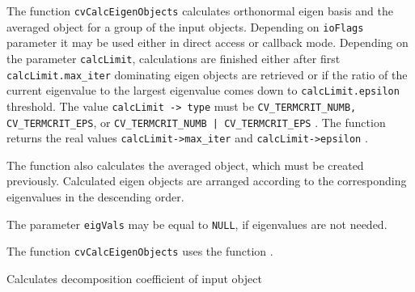 \begin{description}
\end{description}

The function \texttt{cvCalcEigenObjects} calculates orthonormal eigen basis and the averaged object for a group of the input objects. Depending on \texttt{ioFlags} parameter it may be used either in direct access or callback mode. Depending on the parameter \texttt{calcLimit}, calculations are finished either after first \texttt{calcLimit.max\_iter} dominating eigen objects are retrieved or if the ratio of the current eigenvalue to the largest eigenvalue comes down to \texttt{calcLimit.epsilon} threshold. The value \texttt{calcLimit -> type} must be \texttt{CV\_TERMCRIT\_NUMB, CV\_TERMCRIT\_EPS}, or \texttt{CV\_TERMCRIT\_NUMB | CV\_TERMCRIT\_EPS} . The function returns the real values \texttt{calcLimit->max\_iter} and \texttt{calcLimit->epsilon} .

The function also calculates the averaged object, which must be created previously. Calculated eigen objects are arranged according to the corresponding eigenvalues in the descending order.

The parameter \texttt{eigVals} may be equal to \texttt{NULL}, if eigenvalues are not needed.

The function \texttt{cvCalcEigenObjects} uses the function .


Calculates decomposition coefficient of input object


